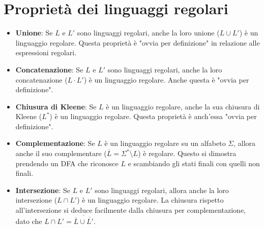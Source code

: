\documentclass[12pt, a4paper]{report}
\begin{document}
        \section{Proprietà dei linguaggi regolari}
            \begin{itemize}
                \item \textbf{Unione}: Se $L$ e $L'$ sono linguaggi regolari, anche la loro unione ($L \cup L'$) è un linguaggio regolare. Questa proprietà è "ovvia per definizione" in relazione alle espressioni regolari.
                \item \textbf{Concatenazione}: Se $L$ e $L'$ sono linguaggi regolari, anche la loro concatenazione ($L \cdot L'$) è un linguaggio regolare. Anche questa è "ovvia per definizione".
                \item \textbf{Chiusura di Kleene}: Se $L$ è un linguaggio regolare, anche la sua chiusura di Kleene ($L^*$) è un linguaggio regolare. Questa proprietà è anch'essa "ovvia per definizione".
                \item \textbf{Complementazione}: Se $L$ è un linguaggio regolare su un alfabeto $\Sigma$, allora anche il suo complementare ($\overline{L} = \Sigma^* \setminus L$) è regolare. Questo si dimostra prendendo un DFA che riconosce $L$ e scambiando gli stati finali con quelli non finali.
                \item \textbf{Intersezione}: Se $L$ e $L'$ sono linguaggi regolari, allora anche la loro intersezione ($L \cap L'$) è un linguaggio regolare. La chiusura rispetto all'intersezione si deduce facilmente dalla chiusura per complementazione, dato che $L \cap L' = \overline{\overline{L} \cup \overline{L'}}$.
            \end{itemize}
\end{document}
